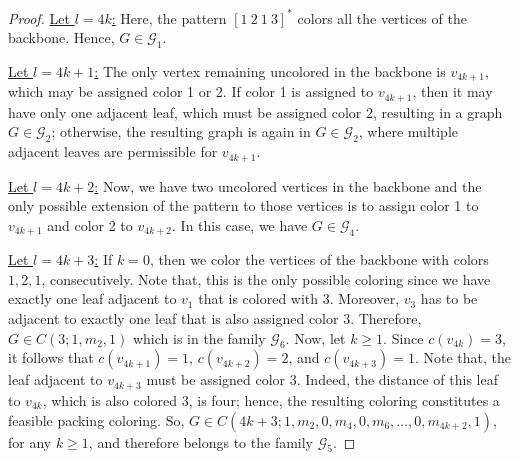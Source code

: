 \documentclass[10pt,a4paper]{amsart}
\begin{document}
\begin{proof}
\underline{Let $l=4k$:} Here, the pattern $[1\ 2\ 1\ 3]^{*}$ colors all the vertices of the backbone. Hence, $G \in \mathcal{G}_{1}$.


\underline{Let $l=4k+1$:} The only vertex remaining uncolored in the backbone is $v_{4k+1}$, which may be assigned color 1 or 2. If color 1 is assigned to $v_{4k+1}$, then it may have only one adjacent leaf, which must be assigned color 2, resulting in a graph $G\in \mathcal{G}_2$; otherwise, the resulting graph is again in  $G\in \mathcal{G}_2$, where multiple adjacent leaves are permissible for $v_{4k+1}$.


\underline{Let $l=4k+2$:} Now, we have two uncolored vertices in the backbone and the only possible extension of the pattern to those vertices is to assign color 1 to $v_{4k+1}$ and color 2 to $v_{4k+2}$.  
In this case, we have $G\in \mathcal{G}_4$.

\underline{Let $l=4k+3$:} If $k=0$, then we color the vertices of the backbone with colors $1,2,1$, consecutively. Note that, this is the only possible coloring since we have exactly one leaf adjacent to $v_1$ that is colored with 3. Moreover, $v_3$ has to be adjacent to exactly one leaf that is also assigned color 3. Therefore, $G \in C(3;1,m_2,1)$ which is in the family $\mathcal{G}_6$. 
Now, let $k\geq 1$. Since $c(v_{4k})=3$, it follows that $c(v_{4k+1})=1$, $c(v_{4k+2})=2$, and $c(v_{4k+3})=1$. Note that, the leaf adjacent to $v_{4k+3}$ must be assigned color 3. Indeed, the distance of this leaf to $v_{4k}$, which is also colored 3, is four; hence, the resulting coloring constitutes a feasible packing coloring. So, $G \in C(4k+3; 1, m_2, 0, m_4, 0, m_6, \ldots, 0, m_{4k+2},1)$, for any $k\geq 1$, and therefore belongs to the family $\mathcal{G}_5$.
    


\end{proof}
\end{document}
